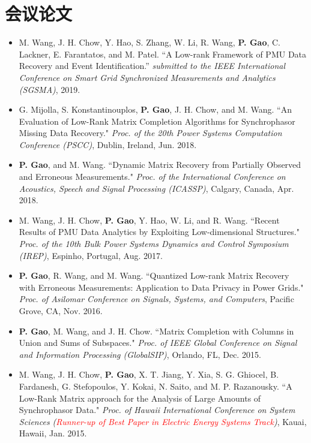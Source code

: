 \documentclass{resume}
\begin{document}
\section{会议论文}
\begin{itemize}[parsep=0.2ex]
\item {M. Wang, J. H. Chow, Y. Hao, S. Zhang, W. Li, R. Wang, {\bf P. Gao}, C. Lackner, E. Farantatos, and M. Patel. ``A Low-rank Framework of PMU Data Recovery and Event Identification.'' \emph{submitted to the IEEE International Conference on Smart Grid Synchronized Measurements and Analytics (SGSMA)}, 2019.}

\item {G. Mijolla, S. Konstantinouplos, {\bf P. Gao}, J. H. Chow, and M. Wang. ``An Evaluation of Low-Rank Matrix Completion Algorithms for Synchrophasor Missing Data Recovery." \emph{Proc. of the 20th Power Systems Computation Conference (PSCC)}, Dublin, Ireland, Jun. 2018.}

\item {{\bf P. Gao}, and M. Wang. ``Dynamic Matrix Recovery from Partially Observed and Erroneous Measurements." \emph{Proc. of the International Conference on Acoustics, Speech and Signal Processing (ICASSP)}, Calgary, Canada, Apr. 2018.}

\item {M. Wang, J. H. Chow, {\bf P. Gao}, Y. Hao, W. Li, and R. Wang. ``Recent Results of PMU Data Analytics by Exploiting Low-dimensional Structures." \emph{Proc. of the 10th Bulk Power Systems Dynamics and Control Symposium (IREP)}, Espinho, Portugal, Aug. 2017.}

\item {{\bf P. Gao}, R. Wang, and M. Wang. ``Quantized Low-rank Matrix Recovery with Erroneous Measurements: Application to Data Privacy in Power Grids." \emph{Proc. of Asilomar Conference on Signals, Systems, and Computers}, Pacific Grove, CA, Nov. 2016.}

\item {{\bf P. Gao}, M. Wang, and J. H. Chow. ``Matrix Completion with Columns in Union and Sums of Subspaces." \emph{Proc. of IEEE Global Conference on Signal and Information Processing (GlobalSIP)}, Orlando, FL, Dec. 2015.}

\item {M. Wang, J. H. Chow, {\bf P. Gao}, X. T. Jiang, Y. Xia, S. G. Ghiocel, B. Fardanesh, G. Stefopoulos, Y. Kokai, N. Saito, and M. P. Razanousky. ``A Low-Rank Matrix approach for the Analysis of Large Amounts of Synchrophasor Data." \emph{Proc. of Hawaii International Conference on System Sciences (\textcolor{red}{Runner-up of Best Paper in Electric Energy Systems Track})}, Kauai, Hawaii, Jan. 2015.}


\end{itemize}
\end{document}
